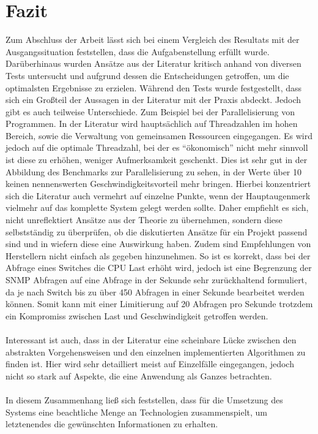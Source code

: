 \chapter{Fazit}
\label{cha:Fazit}

Zum Abschluss der Arbeit lässt sich bei einem Vergleich des Resultats mit der Ausgangssituation feststellen, dass die Aufgabenstellung erfüllt wurde.
Darüberhinaus wurden Ansätze aus der Literatur kritisch anhand von diversen Tests untersucht und aufgrund dessen die Entscheidungen getroffen, um die optimalsten Ergebnisse zu erzielen.
Während den Tests wurde festgestellt, dass sich ein Großteil der Aussagen in der Literatur mit der Praxis abdeckt. Jedoch gibt es auch teilweise Unterschiede.
Zum Beispiel bei der Parallelisierung von Programmen. In der Literatur wird hauptsächlich auf Threadzahlen im hohen Bereich, sowie die Verwaltung von gemeinsamen Ressourcen eingegangen.
Es wird jedoch auf die optimale Threadzahl, bei der es “ökonomisch” nicht mehr sinnvoll ist diese zu erhöhen, weniger Aufmerksamkeit geschenkt.
Dies ist sehr gut in der Abbildung des Benchmarks zur Parallelisierung zu sehen, in der Werte über 10 keinen nennenswerten Geschwindigkeitsvorteil mehr bringen.
Hierbei konzentriert sich die Literatur auch vermehrt auf einzelne Punkte, wenn der Hauptaugenmerk vielmehr auf das komplette System gelegt werden sollte.
Daher empfiehlt es sich, nicht unreflektiert Ansätze aus der Theorie zu übernehmen, sondern diese selbstständig zu überprüfen, ob die diskutierten Ansätze für ein Projekt passend sind und in wiefern diese eine Auswirkung haben.
Zudem sind Empfehlungen von Herstellern nicht einfach als gegeben hinzunehmen.
So ist es korrekt, dass bei der Abfrage eines Switches die CPU Last erhöht wird, jedoch ist eine Begrenzung der SNMP Abfragen auf eine Abfrage in der Sekunde sehr zurückhaltend formuliert, da je nach Switch bis zu über 450 Abfragen in einer Sekunde bearbeitet werden können. Somit kann mit einer Limitierung auf 20 Abfragen pro Sekunde trotzdem ein Kompromiss zwischen Last und Geschwindigkeit getroffen werden.\\\\
Interessant ist auch, dass in der Literatur eine scheinbare Lücke zwischen den abstrakten Vorgehensweisen und den einzelnen implementierten Algorithmen zu finden ist.
Hier wird sehr detailliert meist auf Einzelfälle eingegangen, jedoch nicht so stark auf Aspekte, die eine Anwendung als Ganzes betrachten.\\\\
In diesem Zusammenhang ließ sich feststellen, dass für die Umsetzung des Systems eine beachtliche Menge an Technologien zusammenspielt, um letztenendes die gewünschten Informationen zu erhalten.
